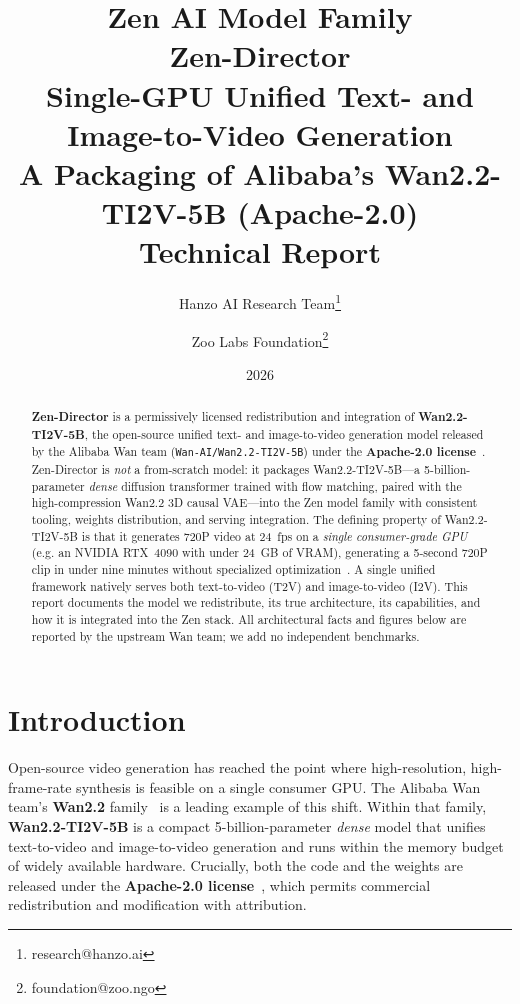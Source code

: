 \documentclass[11pt,a4paper]{article}
\title{
    \vspace{-2cm}
    \Large \textbf{Zen AI Model Family} \\
    \vspace{0.5cm}
    \Huge \textbf{Zen-Director} \\
    \vspace{0.3cm}
    \large Single-GPU Unified Text- and Image-to-Video Generation \\
    \vspace{0.2cm}
    \large \normalsize A Packaging of Alibaba's Wan2.2-TI2V-5B (Apache-2.0) \\
    \vspace{0.5cm}
    \normalsize Technical Report
}
\author{
    Hanzo AI Research Team\thanks{research@hanzo.ai} \and
    Zoo Labs Foundation\thanks{foundation@zoo.ngo}
}
\date{2026}
\begin{document}
\maketitle

\begin{abstract}
\textbf{Zen-Director} is a permissively licensed redistribution and integration of
\textbf{Wan2.2-TI2V-5B}, the open-source unified text- and image-to-video generation model
released by the Alibaba Wan team (\texttt{Wan-AI/Wan2.2-TI2V-5B}) under the
\textbf{Apache-2.0 license}~\cite{wan22hf,wan22github}. Zen-Director is \emph{not} a
from-scratch model: it packages Wan2.2-TI2V-5B---a 5-billion-parameter \emph{dense} diffusion
transformer trained with flow matching, paired with the high-compression Wan2.2 3D causal
VAE---into the Zen model family with consistent tooling, weights distribution, and
serving integration. The defining property of Wan2.2-TI2V-5B is that it generates 720P video
at 24~fps on a \emph{single consumer-grade GPU} (e.g. an NVIDIA RTX~4090 with under 24~GB of
VRAM), generating a 5-second 720P clip in under nine minutes without specialized
optimization~\cite{wan22hf,wan22github}. A single unified framework natively serves both
text-to-video (T2V) and image-to-video (I2V). This report documents the model we redistribute,
its true architecture, its capabilities, and how it is integrated into the Zen stack. All
architectural facts and figures below are reported by the upstream Wan team; we add no
independent benchmarks.
\end{abstract}

\tableofcontents
\newpage

\section{Introduction}

Open-source video generation has reached the point where high-resolution, high-frame-rate
synthesis is feasible on a single consumer GPU. The Alibaba Wan team's \textbf{Wan2.2}
family~\cite{wan22github,wan21paper} is a leading example of this shift. Within that family,
\textbf{Wan2.2-TI2V-5B} is a compact 5-billion-parameter \emph{dense} model that unifies
text-to-video and image-to-video generation and runs within the memory budget of widely
available hardware. Crucially, both the code and the weights are released under the
\textbf{Apache-2.0 license}~\cite{wan22hf,wan22github}, which permits commercial redistribution
and modification with attribution.
\end{document}
